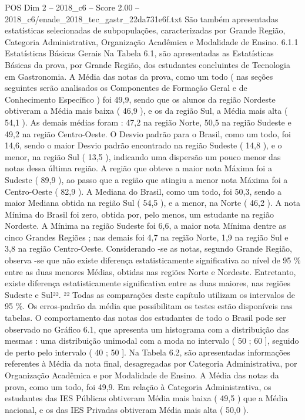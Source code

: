 \begin{textsample}{POS Dim 2 – 2018\_c6 – Score 2.00 – 2018\_c6/enade\_2018\_tec\_gastr\_22da731e6f.txt}
São também apresentadas estatísticas selecionadas de subpopulações, caracterizadas por Grande Região, Categoria Administrativa, Organização Acadêmica e Modalidade de Ensino. 6.1.1 Estatísticas Básicas Gerais Na Tabela 6.1, são apresentadas as Estatísticas Básicas da prova, por Grande Região, dos estudantes concluintes de Tecnologia em Gastronomia.
A Média das notas da prova, como um todo ( nas seções seguintes serão analisados os Componentes de Formação Geral e de Conhecimento Específico ) foi 49,9, sendo que os alunos da região Nordeste obtiveram a Média mais baixa ( 46,9 ), e os da região Sul, a Média mais alta ( 54,1 ).
As demais médias foram : 47,2 na região Norte, 50,5 na região Sudeste e 49,2 na região Centro-Oeste.
O Desvio padrão para o Brasil, como um todo, foi 14,6, sendo o maior Desvio padrão encontrado na região Sudeste ( 14,8 ), e o menor, na região Sul ( 13,5 ), indicando uma dispersão um pouco menor das notas dessa última região.
A região que obteve a maior nota Máxima foi a Sudeste ( 89,9 ), ao passo que a região que atingiu a menor nota Máxima foi a Centro-Oeste ( 82,9 ).
A Mediana do Brasil, como um todo, foi 50,3, sendo a maior Mediana obtida na região Sul ( 54,5 ), e a menor, na Norte ( 46,2 ).
A nota Mínima do Brasil foi zero, obtida por, pelo menos, um estudante na região Nordeste.
A Mínima na região Sudeste foi 6,6, a maior nota Mínima dentre as cinco Grandes Regiões ; nas demais foi 4,7 na região Norte, 1,9 na região Sul e 3,8 na região Centro-Oeste.
Considerando -se as notas, segundo Grande Região, observa -se que não existe diferença estatisticamente significativa ao nível de 95 \% entre as duas menores Médias, obtidas nas regiões Norte e Nordeste.
Entretanto, existe diferença estatisticamente significativa entre as duas maiores, nas regiões Sudeste e Sul²². ²² Todas as comparações deste capítulo utilizam os intervalos de 95 \%.
Os erros-padrão da média que possibilitam os testes estão disponíveis nas tabelas.
O comportamento das notas dos estudantes de todo o Brasil pode ser observado no Gráfico 6.1, que apresenta um histograma com a distribuição das mesmas : uma distribuição unimodal com a moda no intervalo ( 50 ; 60 ], seguido de perto pelo intervalo ( 40 ; 50 ].
Na Tabela 6.2, são apresentadas informações referentes à Média da nota final, desagregadas por Categoria Administrativa, por Organização Acadêmica e por Modalidade de Ensino.
A Média das notas da prova, como um todo, foi 49,9.
Em relação à Categoria Administrativa, os estudantes das IES Públicas obtiveram Média mais baixa ( 49,5 ) que a Média nacional, e os das IES Privadas obtiveram Média mais alta ( 50,0 ).

\end{textsample}
